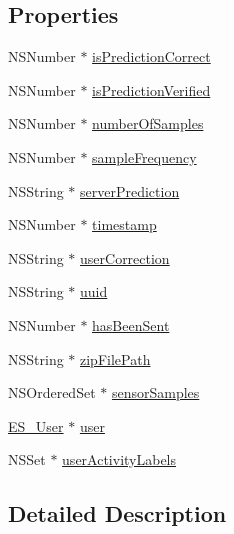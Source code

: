 \subsection*{Properties}
\begin{DoxyCompactItemize}
\item 
N\+S\+Number $\ast$ \hyperlink{interface_e_s___activity_a1fca358f05bf05975c5926bf298f5c96}{is\+Prediction\+Correct}
\item 
N\+S\+Number $\ast$ \hyperlink{interface_e_s___activity_a691d337933c588bd27cacebecf6fab75}{is\+Prediction\+Verified}
\item 
N\+S\+Number $\ast$ \hyperlink{interface_e_s___activity_a2667eb77113737e28ee241d0f3420cf9}{number\+Of\+Samples}
\item 
N\+S\+Number $\ast$ \hyperlink{interface_e_s___activity_a2cbaca9a037e71bcdf7cc4109861645a}{sample\+Frequency}
\item 
N\+S\+String $\ast$ \hyperlink{interface_e_s___activity_a9df3ca0381a39960cca5728b786f26d3}{server\+Prediction}
\item 
N\+S\+Number $\ast$ \hyperlink{interface_e_s___activity_a92c04ad06e9e97b2631df34fb00debff}{timestamp}
\item 
N\+S\+String $\ast$ \hyperlink{interface_e_s___activity_a4845c6fe9c100e0cd7c631b4e38714be}{user\+Correction}
\item 
N\+S\+String $\ast$ \hyperlink{interface_e_s___activity_a256b873f15c1fe13c3391c60c2717472}{uuid}
\item 
N\+S\+Number $\ast$ \hyperlink{interface_e_s___activity_a960661107a6c1d2ae3cc0f470d2cf929}{has\+Been\+Sent}
\item 
N\+S\+String $\ast$ \hyperlink{interface_e_s___activity_ad428e875c7511ddbc1b3df65bdabeef7}{zip\+File\+Path}
\item 
N\+S\+Ordered\+Set $\ast$ \hyperlink{interface_e_s___activity_aa7b0f298e21d72c89289080380c61e5f}{sensor\+Samples}
\item 
\hyperlink{interface_e_s___user}{E\+S\+\_\+\+User} $\ast$ \hyperlink{interface_e_s___activity_ac57db029bedd775a342f6eed16b61a90}{user}
\item 
N\+S\+Set $\ast$ \hyperlink{interface_e_s___activity_a31cda9e2e1eeed6ab17af9dc2032d263}{user\+Activity\+Labels}
\end{DoxyCompactItemize}


\subsection{Detailed Description}


